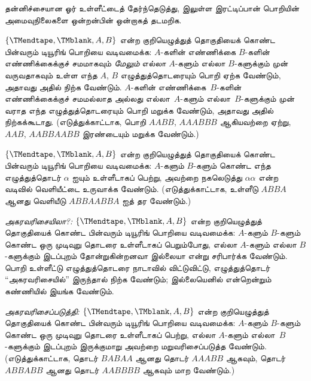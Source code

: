 \documentclass[../../../include/open-logic-section]{subfiles}
\begin{document}
\begin{prob}
தன்னிச்சையான ஓர் உள்ளீட்டைத் தேர்ந்தெடுத்து,
 இலுள்ள இரட்டிப்பான் பொறியின்
அமைவுநிலைகளை ஒன்றன்பின் ஒன்றாகத் தடமறிக.
\end{prob}

\begin{prob}
$\{\TMendtape,\TMblank, A, B\}$ என்ற குறியெழுத்துத் தொகுதியைக்
கொண்ட பின்வரும் டியூரிங் பொறியை வடிவமைக்க: $A$-களின் எண்ணிக்கை
$B$-களின் எண்ணிக்கைக்குச் சமமாகவும் \emph{மேலும்} எல்லா $A$-களும்
எல்லா $B$-களுக்கும் முன் வருவதாகவும் உள்ள எந்த $A$, $B$
எழுத்துத்தொடரையும் பொறி ஏற்க வேண்டும், அதாவது அதில் நிற்க வேண்டும்.
$A$-களின் எண்ணிக்கை~$B$-களின் எண்ணிக்கைக்குச் சமமல்லாத அல்லது
எல்லா~$A$-களும் எல்லா~$B$-களுக்கும் முன் வராத எந்த
எழுத்துத்தொடரையும் பொறி மறுக்க வேண்டும், அதாவது அதில் நிற்கக்கூடாது.
(எடுத்துக்காட்டாக, பொறி $AABB$, $AAABBB$ ஆகியவற்றை ஏற்று,
$AAB$, $AABBAABB$ இரண்டையும் மறுக்க வேண்டும்.)
\end{prob}

\begin{prob}
$\{\TMendtape,\TMblank, A, B\}$ என்ற குறியெழுத்துத் தொகுதியைக்
கொண்ட பின்வரும் டியூரிங் பொறியை வடிவமைக்க: $A$-களும் $B$-களும்
கொண்ட எந்த எழுத்துத்தொடர் $\alpha$ ஐயும் உள்ளீடாகப் பெற்று,
அவற்றை நகலெடுத்து $\alpha\alpha$ என்ற வடிவில் வெளியீட்டை உருவாக்க
வேண்டும். (எடுத்துக்காட்டாக, உள்ளீடு $ABBA$ ஆனது வெளியீடு
$ABBAABBA$ ஐத் தர வேண்டும்.)
\end{prob}

\begin{prob}
\emph{அகரவரிசையிலா?:} $\{\TMendtape,\TMblank, A, B\}$ என்ற
குறியெழுத்துத் தொகுதியைக் கொண்ட பின்வரும் டியூரிங் பொறியை வடிவமைக்க:
$A$-களும் $B$-களும் கொண்ட ஒரு முடிவுறு தொடரை உள்ளீடாகப்
பெறும்போது, எல்லா $A$-களும் எல்லா $B$-களுக்கும் இடப்புறம்
தோன்றுகின்றனவா இல்லையா என்று சரிபார்க்க வேண்டும். பொறி உள்ளீட்டு
எழுத்துத்தொடரை நாடாவில் விட்டுவிட்டு, எழுத்துத்தொடர்
``அகரவரிசையில்'' இருந்தால் நிற்க வேண்டும்; இல்லையெனில்
என்றென்றும் கண்ணியில் இயங்க வேண்டும்.
\end{prob}

\begin{prob}
\emph{அகரவரிசைப்படுத்தி:} $\{\TMendtape,\TMblank, A, B\}$ என்ற
குறியெழுத்துத் தொகுதியைக் கொண்ட பின்வரும் டியூரிங் பொறியை வடிவமைக்க:
$A$-களும் $B$-களும் கொண்ட ஒரு முடிவுறு தொடரை உள்ளீடாகப் பெற்று,
எல்லா $A$-களும் எல்லா~$B$-களுக்கும் இடப்புறம் இருக்குமாறு அவற்றை
மறுவரிசைப்படுத்த வேண்டும். (எடுத்துக்காட்டாக, தொடர் $BABAA$ ஆனது
தொடர் $AAABB$ ஆகவும், தொடர் $ABBABB$ ஆனது தொடர் $AABBBB$ ஆகவும்
மாற வேண்டும்.)
\end{prob}
\end{document}
